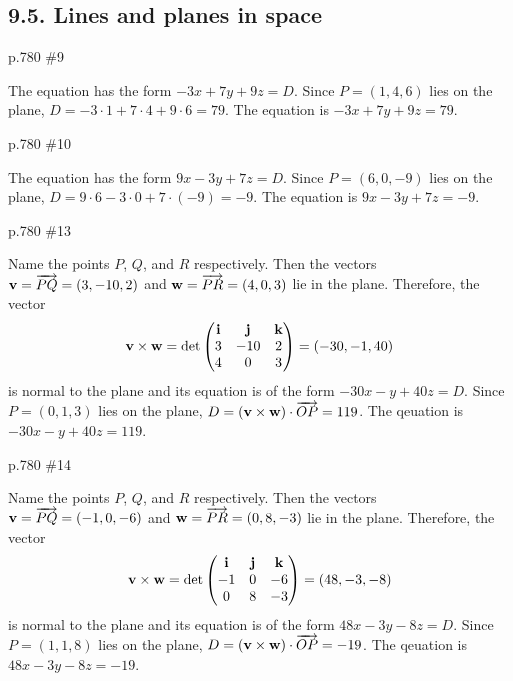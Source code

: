 \subsection*{9.5. Lines and planes in space}
\begin{practice}p.780 \#9\end{practice}
\begin{pracsol}
  The equation has the form $-3x+7y+9z=D$. Since $P=(1,4,6)$ lies on the plane, $D=-3\cdot 1+7\cdot 4+9\cdot 6=79$. The equation is $-3x+7y+9z=79$.
\end{pracsol}
\begin{practice}p.780 \#10\end{practice}
\begin{pracsol}
  The equation has the form $9x-3y+7z=D$. Since $P=(6,0,-9)$ lies on the plane, $D=9\cdot 6-3\cdot 0+7\cdot(-9)=-9$. The equation is $9x-3y+7z=-9$.
\end{pracsol}
\begin{practice}p.780 \#13\end{practice}
\begin{pracsol}
  Name the points $P$, $Q$, and $R$ respectively. Then the vectors $\mathbf v=\overrightarrow{PQ}=(3,-10,2)$ and $\mathbf w=\overrightarrow{PR}=(4,0,3)$ lie in the plane. Therefore, the vector
  \[\mathbf v\times\mathbf w=\det\begin{pmatrix}
    \mathbf i & \mathbf j & \mathbf k\\
    3 & -10 & 2\\
    4 & 0 & 3
  \end{pmatrix}=(-30,-1,40)\]
  is normal to the plane and its equation is of the form $-30x-y+40z=D$. Since $P=(0,1,3)$ lies on the plane, $D=(\mathbf v\times\mathbf w)\cdot\overrightarrow{OP}=119$. The qeuation is $-30x-y+40z=119$.
\end{pracsol}
\begin{practice}p.780 \#14\end{practice}
\begin{pracsol}
  Name the points $P$, $Q$, and $R$ respectively. Then the vectors $\mathbf v=\overrightarrow{PQ}=(-1,0,-6)$ and $\mathbf w=\overrightarrow{PR}=(0,8,-3)$ lie in the plane. Therefore, the vector
  \[\mathbf v\times\mathbf w=\det\begin{pmatrix}
    \mathbf i & \mathbf j & \mathbf k\\
    -1 & 0 & -6\\
    0 & 8 & -3
  \end{pmatrix}=(48,-3,-8)\]
  is normal to the plane and its equation is of the form $48x-3y-8z=D$. Since $P=(1,1,8)$ lies on the plane, $D=(\mathbf v\times\mathbf w)\cdot\overrightarrow{OP}=-19$. The qeuation is $48x-3y-8z=-19$.
\end{pracsol}

